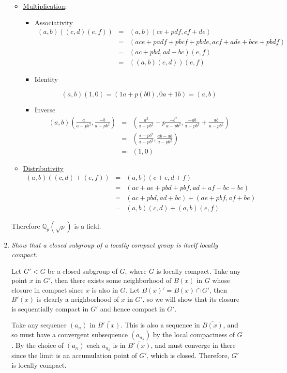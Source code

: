 \documentclass[11pt]{article}
\begin{document}
\begin{enumerate}
\begin{itemize}
\item{\underline{Multiplication}:}
\begin{itemize}
\item{Associativity}
\begin{eqnarray*}
(a,b)((c,d)(e,f)) &=& (a,b)(ce+pdf,cf+de) \\
&=& (ace+padf+pbcf+pbde,acf+ade+bce+pbdf) \\
&=& (ac+pbd,ad+bc)(e,f) \\
&=&((a,b)(c,d))(e,f)
\end{eqnarray*}

\item{Identity}

\[(a,b)(1,0)=(1a + p(b0),0a+1b)=(a,b)\]

\item{Inverse}
\begin{eqnarray*}
(a,b)\left(\frac{a}{a-pb^2},\frac{-b}{a-pb^2}\right) &=& \left(\frac{a^2}{a-pb^2}+p\frac{-b^2}{a-pb^2}, \frac{-ab}{a-pb^2}+\frac{ab}{a-pb^2}\right) \\
&=& \left(\frac{a-pb^2}{a-pb^2},\frac{ab-ab}{a-pb^2}\right) \\
&=& (1,0)
\end{eqnarray*}
\end{itemize}

\item{\underline{Distributivity}}
\begin{eqnarray*}
(a,b)((c,d)+(e,f)) &=& (a,b)(c+e,d+f) \\
&=& (ac+ae+pbd+pbf,ad+af+bc+be) \\ 
&=& (ac+pbd,ad+bc)+(ae+pbf,af+be) \\
&=& (a,b)(c,d)+(a,b)(e,f)
\end{eqnarray*}
\end{itemize}

Therefore $\mathbb{Q}_p(\sqrt{p})$ is a field.
\item \emph{Show that a closed subgroup of a locally compact group is itself locally compact.}

Let $G' < G$ be a closed subgroup of $G$, where $G$ is locally compact.  Take any point $x$ in $G'$, then there exists some neighborhood of $B(x)$ in $G$ whose closure in compact since $x$ is also in $G$.  Let $B(x)' = B(x) \cap G'$, then $B'(x)$ is clearly a neighborhood of $x$ in $G'$, so we will show that its closure is sequentially compact in $G'$ and hence compact in $G'$.

Take any sequence $(a_n)$ in $\overline{B'(x)}$.  This is also a sequence in $\overline{B(x)}$, and so must have a convergent subsequence $(a_{n_k})$ by the local compactness of $G$.  By the choice of $(a_n)$ each $a_{n_k}$ is in $\overline{B'(x)}$, and must converge in there since the limit is an accumulation point of $G'$, which is closed.  Therefore, $G'$ is locally compact.


\end{enumerate}
\end{document}
